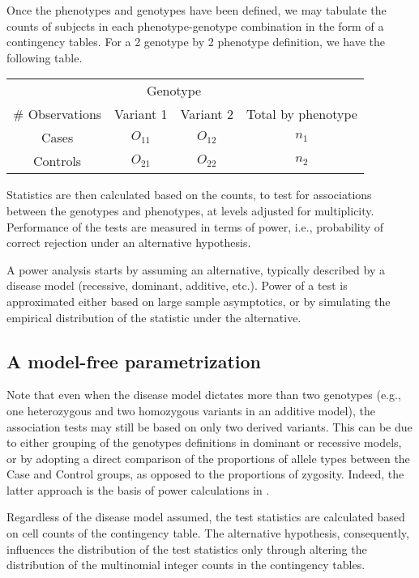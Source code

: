 Once the phenotypes and genotypes have been defined, we may tabulate the counts of subjects in each phenotype-genotype combination in the form of a contingency tables.
For a 2 genotype by 2 phenotype definition, we have the following table.
\begin{center}
    \begin{tabular}{cccc}
    \hline
    & \multicolumn{2}{c}{Genotype} & \\
    \cline{2-3}
    \# Observations & Variant 1 & Variant 2 & Total by phenotype \\
    \hline
    Cases & $O_{11}$ & $O_{12}$ & $n_1$ \\
    Controls & $O_{21}$ & $O_{22}$ & $n_2$ \\
    \hline
    \end{tabular}
\end{center}
Statistics are then calculated based on the counts, to test for associations between the genotypes and phenotypes, at levels adjusted for multiplicity.
Performance of the tests are measured in terms of power, i.e., probability of correct rejection under an alternative hypothesis.

A power analysis starts by assuming an alternative, typically described by a disease model (recessive, dominant, additive, etc.).
Power of a test is approximated either based on large sample asymptotics, or by simulating the empirical distribution of the statistic under the alternative.

\subsection{A model-free parametrization}

Note that even when the disease model dictates more than two genotypes (e.g., one heterozygous and two homozygous variants in an additive model), the association tests may still be based on only two derived variants.
This can be due to either grouping of the genotypes definitions in dominant or recessive models, or by adopting a direct comparison of the proportions of allele types between the Case and Control groups, as opposed to the proportions of zygosity.
Indeed, the latter approach is the basis of power calculations in \cite{Skol06}.

Regardless of the disease model assumed, the test statistics are calculated based on cell counts of the contingency table.
The alternative hypothesis, consequently, influences the distribution of the test statistics only through altering the distribution of the multinomial integer counts in the contingency tables.


